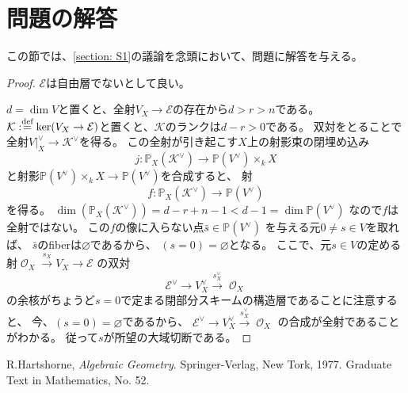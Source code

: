 \documentclass[uplatex]{jsarticle}
\theoremstyle{definition}
\renewcommand{\P}{\mathbb{P}}
\newcommand{\mcE}{\mathcal{E}}
\newcommand{\mcK}{\mathcal{K}}
\newcommand{\mcO}{\mathcal{O}}
\DeclareMathOperator{\OOO}{\mcO}
\newcommand{\OX}{{\OOO_X}}
\renewcommand{\emptyset}{\varnothing}
\def\dfn{:\overset{\mbox{{\scriptsize def}}}{=}}
\begin{document}
\section{問題の解答}


この節では、\autoref{section: S1}の議論を念頭において、問題に解答を与える。


\begin{proof}
  \(\mcE\)は自由層でないとして良い。

  \(d=\dim V\)と置くと、全射\(V_X\to \mcE\)の存在から\(d > r > n\)である。
  \(\mcK\dfn \ker (V_X\to \mcE)\)と置くと、\(\mcK\)のランクは\(d-r > 0\)である。
  双対をとることで全射\(V|_X^{\vee} \to \mcK^{\vee}\)を得る。
  この全射が引き起こす\(X\)上の射影束の閉埋め込み
  \[j:\P_X(\mcK^{\vee})\to \P(V^{\vee})\times_k X\]
  と射影\(\P(V^{\vee})\times_k X\to \P(V^{\vee})\)を合成すると、
  射
  \[
  f:\P_X(\mcK^{\vee})\to \P(V^{\vee})
  \]
  を得る。
  \(\dim (\P_X(\mcK^{\vee})) = d-r+n-1 < d-1 = \dim \P(V^{\vee})\)
  なので\(f\)は全射ではない。
  この\(f\)の像に入らない点\(\bar{s}\in \P(V^{\vee})\)
  を与える元\(0\neq s\in V\)を取れば、
  \(\bar{s}\)のfiberは\(\emptyset\)であるから、
  \((s=0)=\emptyset\)となる。
  ここで、元\(s\in V\)の定める射\(\OX\xrightarrow{s_X}V_X \to \mcE\)
  の双対
  \[\mcE^{\vee}\to V^{\vee}_X \xrightarrow{s_X^{\vee}} \OX\]
  の余核がちょうど\(s=0\)で定まる閉部分スキームの構造層であることに注意すると、
  今、\((s=0)=\emptyset\)であるから、
  \(\mcE^{\vee}\to V^{\vee}_X \xrightarrow{s_X^{\vee}} \OX\)
  の合成が全射であることがわかる。
  従って\(s\)が所望の大域切断である。
\end{proof}








\begin{thebibliography}{9}
  R.Hartshorne,
  \textit{Algebraic Geometry}.
  Springer-Verlag, New Tork, 1977. Graduate Text in Mathematics, No. 52.
\end{thebibliography}
\end{document}
